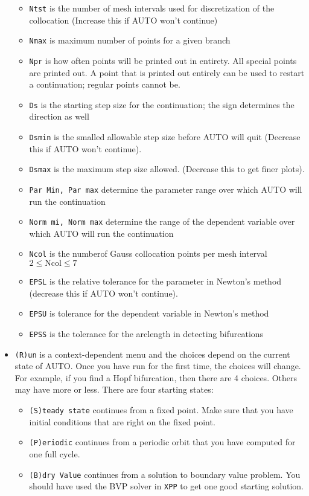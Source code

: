 \documentclass{article}
\begin{document}
\begin{itemize}
\begin{itemize}
\item {\tt Ntst} is the number of mesh intervals used for discretization of the collocation (Increase this if AUTO won't continue)
\item {\tt Nmax} is maximum number of points for a given branch
\item {\tt Npr} is how often points will be printed out in entirety. All special points are printed out. A point that is printed out entirely can be used to restart a continuation; regular points cannot be. 
\item{\tt Ds} is the starting step size for the continuation; the sign determines the direction as well
\item{\tt Dsmin} is the smalled allowable step size before AUTO will quit (Decrease this if AUTO won't continue).
\item{\tt Dsmax} is the maximum step size allowed. (Decrease this to get finer plots).
\item {\tt Par Min, Par max} determine the parameter range over which AUTO will run the continuation
\item {\tt Norm mi, Norm max} determine the range of the dependent variable over which AUTO will run the continuation 
\item {\tt Ncol} is the numberof Gauss collocation points per mesh interval $2\le \mbox{Ncol} \le 7$
\item {\tt EPSL} is the relative tolerance for the parameter in Newton's method (decrease this if AUTO won't continue).
\item {\tt EPSU} is tolerance for the dependent variable in Newton's method
\item{\tt EPSS} is the tolerance for the arclength in detecting bifurcations
\end{itemize}
\item {\tt (R)un} is a context-dependent menu and the choices depend on the current state of AUTO. Once you have run for the first time, the choices will change. For example, if you find a Hopf bifurcation, then there are 4 choices. Others may have more or less. There are four starting states:
\begin{itemize}
\item {\tt (S)teady state} continues from a fixed point. Make sure that you have initial conditions that are right on the fixed point.
\item {\tt (P)eriodic} continues from a periodic orbit that you have computed for one full cycle.
\item {\tt (B)dry Value} continues from a solution to  boundary value problem. You should have used the BVP solver in {\tt XPP} to get one good starting solution.

\end{itemize}
\end{itemize}
\end{document}
